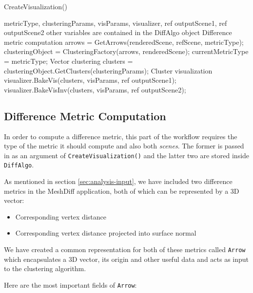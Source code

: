 \begin{algorithm}[H]
\caption{CreateVisualization()}
\label{algo:create_vis}
\begin{algorithmic}[1]

\Require metricType, clusteringParams, visParams, visualizer, ref outputScene1, ref outputScene2 \Comment other variables are contained in the DiffAlgo object
\Statex
\Statex \Comment Difference metric computation
	\State arrows = GetArrows(renderedScene, refScene, metricType);
    \State clusteringObject = ClusteringFactory(arrows, renderedScene);
    \State currentMetricType = metricType;
\EndIf
\Statex \Comment Vector clustering
\State clusters = clusteringObject.GetClusters(clusteringParams);
\Statex \Comment Cluster visualization
\State visualizer.BakeVis(clusters, visParams, ref outputScene1);
\State visualizer.BakeVisInv(clusters, visParams, ref outputScene2);
\Statex
\Return
\end{algorithmic}
\end{algorithm}

\subsection{Difference Metric Computation}
\label{subsec:implementation-algorithm-metrics}

In order to compute a difference metric, this part of the workflow requires the type of the metric it should compute and also both {\it scenes}. The former is passed in as an argument of \verb+CreateVisualization()+ and the latter two are stored inside \verb+DiffAlgo+.

As mentioned in section \ref{sec:analysis-input}, we have included two difference metrics in the MeshDiff application, both of which can be represented by a 3D vector:

\begin{itemize}
\item Corresponding vertex distance
\item Corresponding vertex distance projected into surface normal
\end{itemize}

We have created a common representation for both of these metrics called \verb+Arrow+ which encapsulates a 3D vector, its origin and other useful data and acts as input to the clustering algorithm.

Here are the most important fields of \verb+Arrow+:

